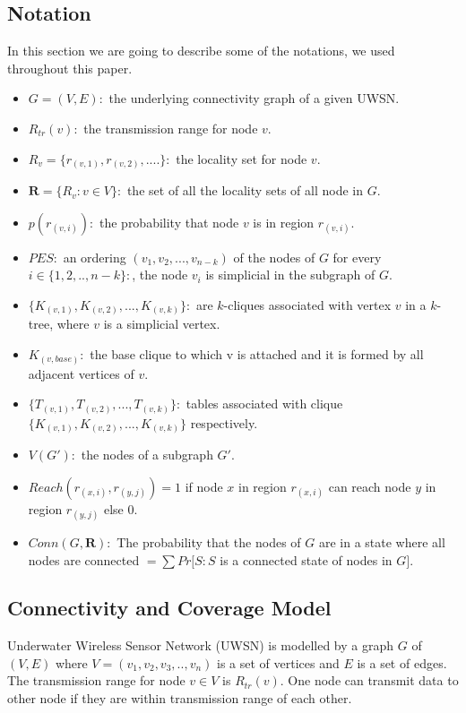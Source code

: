 \documentclass[11pt]{article}
\begin{document}
\subsection{Notation}
In this section we are going to describe some of the notations, we used throughout this paper.
\begin{itemize}[noitemsep,nolistsep]
\item $G=(V,E):$ the underlying connectivity graph of a given UWSN.
\item $R_{tr}(v):$ the transmission range for node $v$.
\item $R_v=\{r_{(v,1)},r_{(v,2)},....\}:$  the locality set for node $v$.
\item $\textbf{R}=\{ R_v:v\in V\}:$ the set of all the locality sets of all node in $G$.
\item $p(r_{(v,i)}):$ the probability that node $v$ is in region $r_{(v,i)}$.
\item $PES :$  an ordering $(v_1,v_2,...,v_{n-k})$ of the nodes of $G$ for every $i\in \{1,2,..,n-k\}:$, the node $v_i$ is simplicial in the subgraph of $G$. 
\item $\{K_{(v,1)},K_{(v,2)},...,K_{(v,k)}\}:$ are $k$-cliques associated with vertex $v$ in a $k$-tree, where $v$ is a simplicial vertex.
\item $K_{(v,base)}:$ the base clique to which v is attached and it is  formed by all adjacent vertices of $v$.
\item $\{T_{(v,1)}, T_{(v,2)},...,T_{(v,k)}\}:$ tables associated with clique $\{K_{(v,1)},K_{(v,2)},...,K_{(v,k)}\}$ respectively.
\item $V(G'):$ the nodes of a subgraph $G'$.
 
\item $Reach(r_{(x,i)},r_{(y,j)}) =1$  if node $x$ in region $r_{(x,i)}$ can reach node $y$ in region $r_{(y,j)}$ else $0$.
\item $Conn(G,\textbf{R}):$ The probability that the nodes of $G$ are in a state where all nodes are connected $= \sum Pr[S:S $ is a connected state of nodes in $G]$.
\end{itemize}
\subsection{Connectivity and Coverage Model}
\label{subsec:conAndCoverage}
Underwater Wireless Sensor Network (UWSN) is modelled by a graph $ G$ of \((V,E)\) where \(V=(v_1,v_2,v_3,..,v_n)\) is a set of vertices and $E$ is a set of edges. The transmission range for node \(v\in V\)  is  \(R_{tr}(v)\). One node can transmit data to other node if they are within transmission range of each other.
\end{document}
